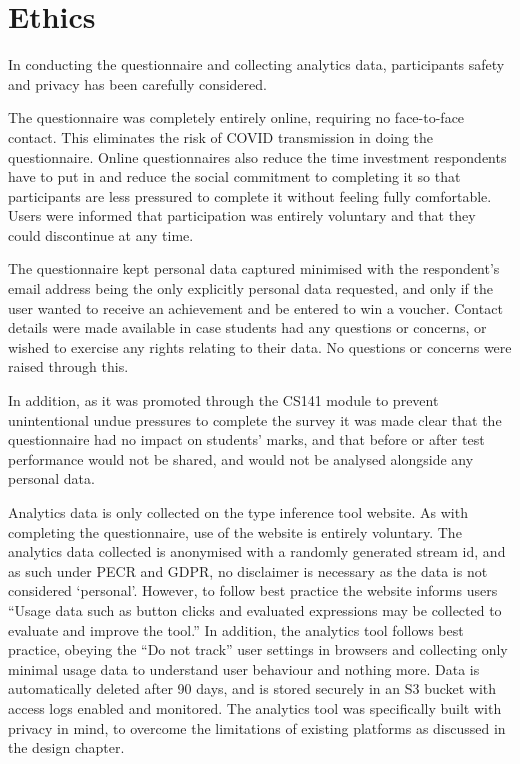 \documentclass[a4paper,fleqn,twoside,12pt]{report}
\begin{document}
\section{Ethics}\label{id:h.q5st3bb4afm1}
In conducting the questionnaire and collecting analytics data, participants safety and privacy has been carefully considered.

The questionnaire was completely entirely online, requiring no face-to-face contact. This eliminates the risk of COVID transmission in doing the questionnaire. Online questionnaires also reduce the time investment respondents have to put in and reduce the social commitment to completing it so that participants are less pressured to complete it without feeling fully comfortable. Users were informed that participation was entirely voluntary and that they could discontinue at any time.

The questionnaire kept personal data captured minimised with the respondent’s email address being the only explicitly personal data requested, and only if the user wanted to receive an achievement and be entered to win a voucher. Contact details were made available in case students had any questions or concerns, or wished to exercise any rights relating to their data. No questions or concerns were raised through this.

In addition, as it was promoted through the CS141 module to prevent unintentional undue pressures to complete the survey it was made clear that the questionnaire had no impact on students’ marks, and that before or after test performance would not be shared, and would not be analysed alongside any personal data.

Analytics data is only collected on the type inference tool website. As with completing the questionnaire, use of the website is entirely voluntary. The analytics data collected is anonymised with a randomly generated stream id, and as such under PECR and GDPR, no disclaimer is necessary as the data is not considered ‘personal’. However, to follow best practice the website informs users “Usage data such as button clicks and evaluated expressions may be collected to evaluate and improve the tool.” In addition, the analytics tool follows best practice, obeying the “Do not track” user settings in browsers and collecting only minimal usage data to understand user behaviour and nothing more. Data is automatically deleted after 90 days, and is stored securely in an S3 bucket with access logs enabled and monitored. The analytics tool was specifically built with privacy in mind, to overcome the limitations of existing platforms as discussed in the design chapter.
\end{document}
